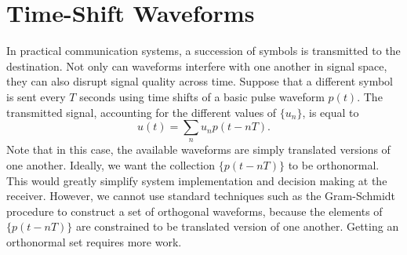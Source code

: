 \section{Time-Shift Waveforms}

In practical communication systems, a succession of symbols is transmitted to the destination.
Not only can waveforms interfere with one another in signal space, they can also disrupt signal quality across time.
Suppose that a different symbol is sent every $T$ seconds using time shifts of a basic pulse waveform $p(t)$.
The transmitted signal, accounting for the different values of $\{ u_n \}$, is equal to
\begin{equation*}
u(t) = \sum_{n} u_n p (t - nT) .
\end{equation*}
Note that in this case, the available waveforms are simply translated versions of one another.
Ideally, we want the collection $\{ p(t - nT) \}$ to be orthonormal.
This would greatly simplify system implementation and decision making at the receiver.
However, we cannot use standard techniques such as the Gram-Schmidt procedure to construct a set of orthogonal waveforms, because the elements of $\{ p(t - nT) \}$ are constrained to be translated version of one another.
Getting an orthonormal set requires more work.

